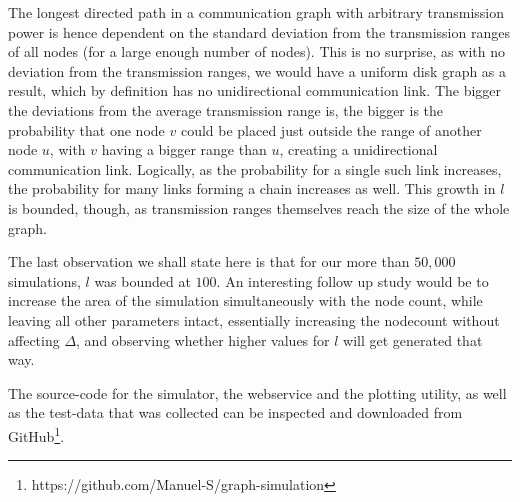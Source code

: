 The longest directed path in a communication graph with arbitrary transmission power is hence dependent on the standard deviation from the transmission ranges of all nodes (for a large enough number of nodes). This is no surprise, as with no deviation from the transmission ranges, we would have a uniform disk graph as a result, which by definition has no unidirectional communication link. The bigger the deviations from the average transmission range is, the bigger is the probability that one node $v$ could be placed just outside the range of another node $u$, with $v$ having a bigger range than $u$, creating a unidirectional communication link. Logically, as the probability for a single such link increases, the probability for many links forming a chain increases as well. This growth in $l$ is bounded, though, as transmission ranges themselves reach the size of the whole graph.

The last observation we shall state here is that for our more than $50,000$ simulations, $l$ was bounded at $100$. An interesting follow up study would be to increase the area of the simulation simultaneously with the node count, while leaving all other parameters intact, essentially increasing the nodecount without affecting $\Delta$, and observing whether higher values for $l$ will get generated that way.

The source-code for the simulator, the webservice and the plotting utility, as well as the test-data that was collected can be inspected and downloaded from GitHub\footnote{https://github.com/Manuel-S/graph-simulation}.



